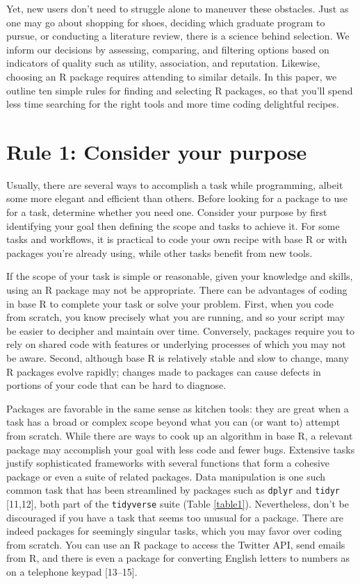 \documentclass[10pt,letterpaper]{article}
\begin{document}
Yet, new users don't need to struggle alone to maneuver these obstacles.
Just as one may go about shopping for shoes, deciding which graduate
program to pursue, or conducting a literature review, there is a science
behind selection. We inform our decisions by assessing, comparing, and
filtering options based on indicators of quality such as utility,
association, and reputation. Likewise, choosing an R package requires
attending to similar details. In this paper, we outline ten simple rules
for finding and selecting R packages, so that you'll spend less time
searching for the right tools and more time coding delightful recipes.

\hypertarget{rule-1-consider-your-purpose}{%
\section{Rule 1: Consider your
purpose}\label{rule-1-consider-your-purpose}}

Usually, there are several ways to accomplish a task while programming,
albeit some more elegant and efficient than others. Before looking for a
package to use for a task, determine whether you need one. Consider your
purpose by first identifying your goal then defining the scope and tasks
to achieve it. For some tasks and workflows, it is practical to code
your own recipe with base R or with packages you're already using, while
other tasks benefit from new tools.

If the scope of your task is simple or reasonable, given your knowledge
and skills, using an R package may not be appropriate. There can be
advantages of coding in base R to complete your task or solve your
problem. First, when you code from scratch, you know precisely what you
are running, and so your script may be easier to decipher and maintain
over time. Conversely, packages require you to rely on shared code with
features or underlying processes of which you may not be aware. Second,
although base R is relatively stable and slow to change, many R packages
evolve rapidly; changes made to packages can cause defects in portions
of your code that can be hard to diagnose.

Packages are favorable in the same sense as kitchen tools: they are
great when a task has a broad or complex scope beyond what you can (or
want to) attempt from scratch. While there are ways to cook up an
algorithm in base R, a relevant package may accomplish your goal with
less code and fewer bugs. Extensive tasks justify sophisticated
frameworks with several functions that form a cohesive package or even a
suite of related packages. Data manipulation is one such common task
that has been streamlined by packages such as \texttt{dplyr} and
\texttt{tidyr} {[}11,12{]}, both part of the \texttt{tidyverse} suite
(Table \ref{table1}). Nevertheless, don't be discouraged if you have a
task that seems too unusual for a package. There are indeed packages for
seemingly singular tasks, which you may favor over coding from scratch.
You can use an R package to access the Twitter API, send emails from R,
and there is even a package for converting English letters to numbers as
on a telephone keypad {[}13--15{]}.
\end{document}
